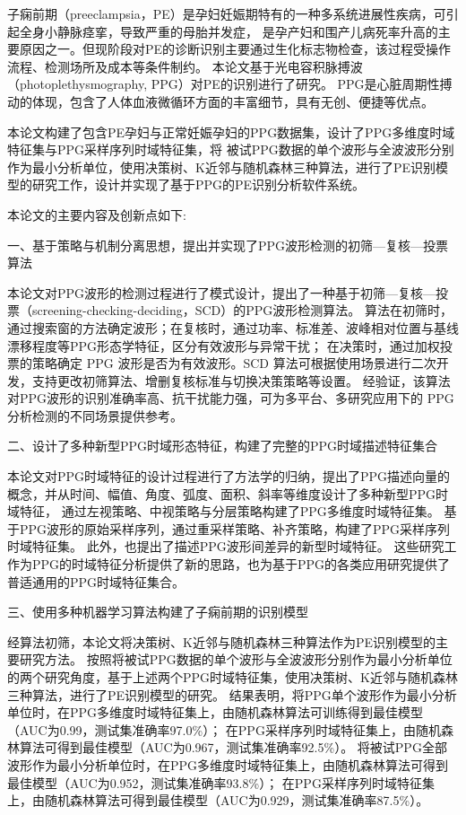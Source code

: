\cleardoublepage
{}
子痫前期（preeclampsia，PE）是孕妇妊娠期特有的一种多系统进展性疾病，可引起全身小静脉痉挛，导致严重的母胎并发症，
是孕产妇和围产儿病死率升高的主要原因之一。但现阶段对PE的诊断识别主要通过生化标志物检查，该过程受操作流程、检测场所及成本等条件制约。
本论文基于光电容积脉搏波（photoplethysmography, PPG）对PE的识别进行了研究。
PPG是心脏周期性搏动的体现，包含了人体血液微循环方面的丰富细节，具有无创、便捷等优点。

本论文构建了包含PE孕妇与正常妊娠孕妇的PPG数据集，设计了PPG多维度时域特征集与PPG采样序列时域特征集，将
被试PPG数据的单个波形与全波波形分别作为最小分析单位，使用决策树、K近邻与随机森林三种算法，进行了PE识别模型的研究工作，设计并实现了基于PPG的PE识别分析软件系统。

本论文的主要内容及创新点如下:

一、基于策略与机制分离思想，提出并实现了PPG波形检测的初筛—复核—投票算法

本论文对PPG波形的检测过程进行了模式设计，提出了一种基于初筛—复核—投票（screening-checking-deciding，SCD）的PPG波形检测算法。
算法在初筛时，通过搜索窗的方法确定波形；在复核时，通过功率、标准差、波峰相对位置与基线漂移程度等PPG形态学特征，区分有效波形与异常干扰；
在决策时，通过加权投票的策略确定 PPG 波形是否为有效波形。SCD 算法可根据使用场景进行二次开发，支持更改初筛算法、增删复核标准与切换决策策略等设置。
经验证，该算法对PPG波形的识别准确率高、抗干扰能力强，可为多平台、多研究应用下的 PPG 分析检测的不同场景提供参考。

二、设计了多种新型PPG时域形态特征，构建了完整的PPG时域描述特征集合

本论文对PPG时域特征的设计过程进行了方法学的归纳，提出了PPG描述向量的概念，并从时间、幅值、角度、弧度、面积、斜率等维度设计了多种新型PPG时域特征，
通过左视策略、中视策略与分层策略构建了PPG多维度时域特征集。
基于PPG波形的原始采样序列，通过重采样策略、补齐策略，构建了PPG采样序列时域特征集。
此外，也提出了描述PPG波形间差异的新型时域特征。
这些研究工作为PPG的时域特征分析提供了新的思路，也为基于PPG的各类应用研究提供了普适通用的PPG时域特征集合。

三、使用多种机器学习算法构建了子痫前期的识别模型

经算法初筛，本论文将决策树、K近邻与随机森林三种算法作为PE识别模型的主要研究方法。
按照将被试PPG数据的单个波形与全波波形分别作为最小分析单位的两个研究角度，基于上述两个PPG时域特征集，使用决策树、K近邻与随机森林三种算法，进行了PE识别模型的研究。
结果表明，将PPG单个波形作为最小分析单位时，在PPG多维度时域特征集上，由随机森林算法可训练得到最佳模型（AUC为0.99，测试集准确率97.0\%）；
在PPG采样序列时域特征集上，由随机森林算法可得到最佳模型（AUC为0.967，测试集准确率92.5\%）。
将被试PPG全部波形作为最小分析单位时，在PPG多维度时域特征集上，由随机森林算法可得到最佳模型（AUC为0.952，测试集准确率93.8\%）；
在PPG采样序列时域特征集上，由随机森林算法可得到最佳模型（AUC为0.929，测试集准确率87.5\%）。

